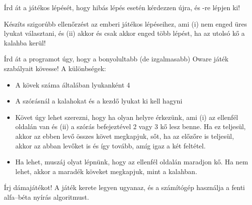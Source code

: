\begin{problem}
Írd át a játékos lépését, hogy hibás lépés
esetén kérdezzen újra, és -re lépjen ki!
\end{problem}
\begin{problem}
Készíts szigorúbb ellenőrzést az emberi játékos
lépéseihez, ami (i) nem enged üres lyukat
választani, és (ii) akkor és csak akkor enged több
lépést, ha az utolsó kő a kalahba kerül!
\end{problem}
\begin{problem}
Írd át a programot úgy, hogy a bonyolultabb (de
izgalmasabb) Oware játék szabályait kövesse!  A
különbségek:
\begin{itemize}
\item A kövek száma általában lyukanként 4
\item A szórásnál a kalahokat és a kezdő lyukat ki kell hagyni
\item Követ úgy lehet szerezni, hogy ha olyan helyre
  érkezünk, ami (i) az ellenfél oldalán van és (ii)
  a szórás befejeztével 2 vagy 3 kő lesz benne.  Ha
  ez teljesül, akkor az ebben levő összes követ
  megkapjuk, sőt, ha az előzőre is teljesül, akkor
  az abban levőket is és így tovább, amíg igaz a két
  feltétel.
\item Ha lehet, muszáj olyat lépnünk, hogy az
  ellenfél oldalán maradjon kő. Ha nem lehet, akkor
  a maradék köveket megkapjuk, mint a kalahban.
\end{itemize}
\end{problem}
\begin{problem}
Írj dámajátékot! A játék kerete legyen ugyanaz,
és a számítógép használja a fenti alfa--béta nyírás
algoritmust.
\end{problem}

